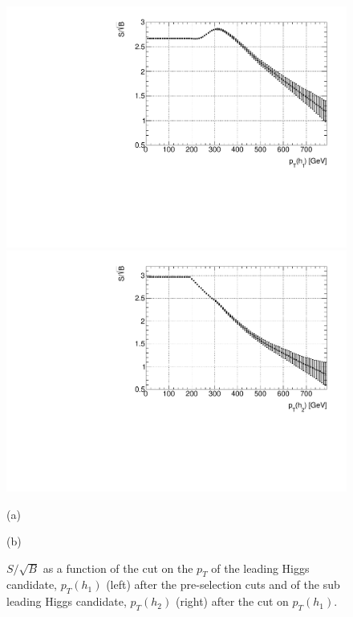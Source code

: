 \begin{figure}
	\centering
	\begin{minipage}{.5\textwidth}
		\centering
		\includegraphics[trim={.6cm 0 0 0},clip,width=\linewidth]{./Figures/SSB_h1_pt.pdf}
	\end{minipage}%
	\begin{minipage}{.5\textwidth}
		\centering
		\includegraphics[trim={0 0 .6cm 0},clip,width=\linewidth]{./Figures/SSB_h2_pt.pdf}
	\end{minipage}
	\begin{minipage}[t]{0.5\textwidth}
		\caption*{(a)}
	\end{minipage}%
	\hfill
	\begin{minipage}[t]{0.5\textwidth}
		\caption*{(b)}
	\end{minipage}
	\caption{$S/\sqrt{B}$ as a function of the cut on the $p_T$ of the leading Higgs candidate, $p_T(h_1)$ (left) after the pre-selection cuts and of the sub leading Higgs candidate, $p_T(h_2)$ (right) after the cut on $p_T(h_1)$.}
	\label{fig:SSB_h1h2_pt}
\end{figure} 

